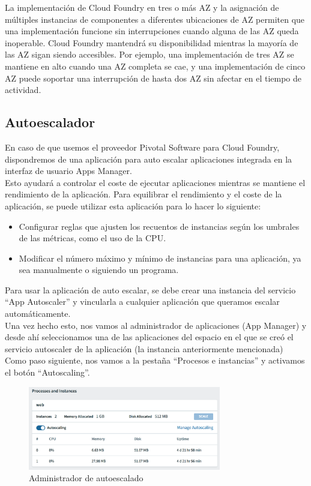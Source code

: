 \documentclass[a4paper,11pt]{article}
\begin{document}
La implementación de Cloud Foundry en tres o más AZ y la asignación de múltiples instancias de componentes a diferentes ubicaciones de AZ permiten que una implementación funcione sin interrupciones cuando alguna de las AZ queda inoperable.
Cloud Foundry mantendrá su disponibilidad mientras la mayoría de las AZ sigan siendo accesibles. Por ejemplo, una implementación de tres AZ se mantiene en alto cuando una AZ completa se cae, y una implementación de cinco AZ puede soportar una interrupción de hasta dos AZ sin afectar en el tiempo de actividad.

\subsection{Autoescalador}
En caso de que usemos el proveedor Pivotal Software para Cloud Foundry, dispondremos de una aplicación para auto escalar aplicaciones integrada en la interfaz de usuario Apps Manager.\\
Esto ayudará a controlar el coste de ejecutar aplicaciones mientras se mantiene el rendimiento de la aplicación. Para equilibrar el rendimiento y el coste de la aplicación, se puede utilizar esta aplicación para lo hacer lo siguiente:
\begin{itemize}
  \item Configurar reglas que ajusten los recuentos de instancias según los umbrales de las métricas, como el uso de la CPU.
  \item Modificar el número máximo y mínimo de instancias para una aplicación, ya sea manualmente o siguiendo un programa.
\end{itemize}
Para usar la aplicación de auto escalar, se debe crear una instancia del servicio “App Autoscaler” y vincularla a cualquier aplicación que queramos escalar automáticamente.\\
Una vez hecho esto, nos vamos al administrador de aplicaciones (App Manager) y desde ahí seleccionamos una de las aplicaciones del espacio en el que se creó el servicio autoscaler de la aplicación (la instancia anteriormente mencionada)\\
Como paso siguiente, nos vamos a la pestaña “Procesos e instancias” y activamos el botón “Autoscaling”.
\begin{figure}[H]
    \centering
    \includegraphics[width=0.75\textwidth]{fran2.png}
    \caption{Administrador de autoescalado}
    \label{fig:fran2}
\end{figure}
\end{document}
